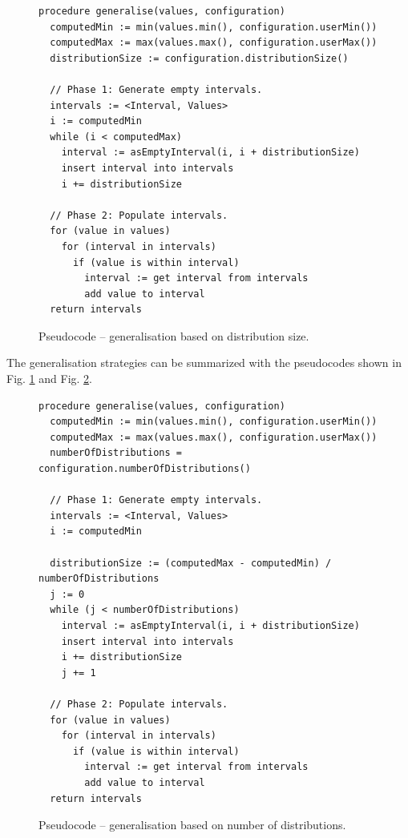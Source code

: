 \documentclass[a4paper,twoside,12pt]{book}
\begin{document}
\begin{figure}[h]
\begin{verbatim}
procedure generalise(values, configuration)
  computedMin := min(values.min(), configuration.userMin())
  computedMax := max(values.max(), configuration.userMax())
  distributionSize := configuration.distributionSize()

  // Phase 1: Generate empty intervals.
  intervals := <Interval, Values>
  i := computedMin
  while (i < computedMax)
    interval := asEmptyInterval(i, i + distributionSize)
    insert interval into intervals
    i += distributionSize

  // Phase 2: Populate intervals.
  for (value in values)
    for (interval in intervals)
      if (value is within interval)
        interval := get interval from intervals
        add value to interval
  return intervals
\end{verbatim}
\caption{Pseudocode – generalisation based on distribution size.}
\label{fig:code:generalisation1}
\end{figure}

The generalisation strategies can be summarized with the pseudocodes shown in Fig. \ref{fig:code:generalisation1} and Fig. \ref{fig:code:generalisation2}.

\begin{figure}[h]
\begin{verbatim}
procedure generalise(values, configuration)
  computedMin := min(values.min(), configuration.userMin())
  computedMax := max(values.max(), configuration.userMax())
  numberOfDistributions = configuration.numberOfDistributions()

  // Phase 1: Generate empty intervals.
  intervals := <Interval, Values>
  i := computedMin
  
  distributionSize := (computedMax - computedMin) / numberOfDistributions
  j := 0    
  while (j < numberOfDistributions)
    interval := asEmptyInterval(i, i + distributionSize)
    insert interval into intervals
    i += distributionSize
    j += 1

  // Phase 2: Populate intervals.
  for (value in values)
    for (interval in intervals)
      if (value is within interval)
        interval := get interval from intervals
        add value to interval
  return intervals
\end{verbatim}
\caption{Pseudocode – generalisation based on number of distributions.}
\label{fig:code:generalisation2}
\end{figure}
\end{document}
